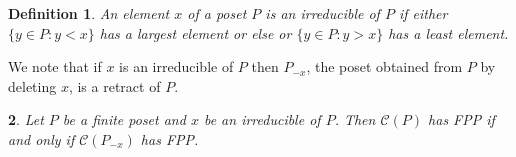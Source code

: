 \documentclass[12pt]{amsart}
\newtheorem{definition}{{\bf Definition}}[section]
\newtheorem{lemma}[definition]{\noindent {\bf Lemma}}
\begin{document}
 \vspace{.3cm}

\begin{definition}
An element $x$ of a poset $P$ is an \emph{irreducible} of $P$ if
either $\{y\in P: y<x\}$ has a largest element or else or $\{y\in P:
y>x\}$ has a least element.
\end{definition}

We note that if $x$ is an irreducible of $P$ then $P_{-x}$, the poset
obtained from $P$ by deleting $x$, is a retract of $P$.

\begin{lemma}\label{lem: joinirreducibility}
Let $P$ be a finite poset and $x$ be an irreducible of $P$.  Then
$\mathcal C (P)$ has FPP if and only if $\mathcal C (P_{-x})$ has
FPP.
\end{lemma} 
\end{document}
